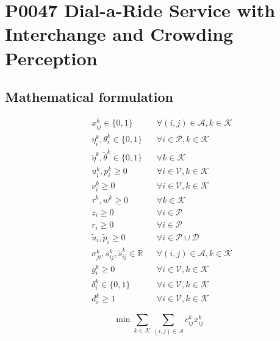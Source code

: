 \documentclass[10pt]{article}
\begin{document}
\section*{P0047 Dial-a-Ride Service with Interchange and Crowding Perception}
\subsection*{Mathematical formulation}
\begin{align*}
& x_{ij}^k \in \{0, 1\} && \forall (i,j) \in \mathcal{A}, k \in \mathcal{K} \\
& \eta_i^k, \theta_i^k \in \{0, 1\} && \forall i \in \mathcal{P}, k \in \mathcal{K} \\
& \tilde{\eta}^k, \tilde{\theta}^k \in \{0,1\} && \forall k \in \mathcal{K} \\
& u_i^k, p_i^k \ge 0 && \forall i \in \mathcal{V}, k \in \mathcal{K} \\
& \nu_i^k \ge 0 && \forall i \in \mathcal{V}, k \in \mathcal{K} \\
& \tau^k, w^k \ge 0 && \forall k \in \mathcal{K} \\
& z_i \ge 0 && \forall i \in \mathcal{P} \\
& r_i \ge 0 && \forall i \in \mathcal{P} \\
& \tilde{u}_i, \tilde{p}_i \ge 0 && \forall i \in \mathcal{P} \cup \mathcal{D} \\
& \sigma_{ji}^k, s_{ij}^k, \tilde{s}_{ij}^k \in \mathbb{R} && \forall (i,j) \in \mathcal{A}, k \in \mathcal{K} \\
& g_i^k \ge 0 && \forall i \in \mathcal{V}, k \in \mathcal{K} \\
& \delta_i^k \in \{0, 1\} && \forall i \in \mathcal{V}, k \in \mathcal{K} \\
& d_i^k \ge 1 && \forall i \in \mathcal{V}, k \in \mathcal{K}
\end{align*}

\[
\min \sum_{k \in \mathcal{K}} \sum_{(i,j) \in \mathcal{A}} c_{ij}^k x_{ij}^k
\]
\end{document}
